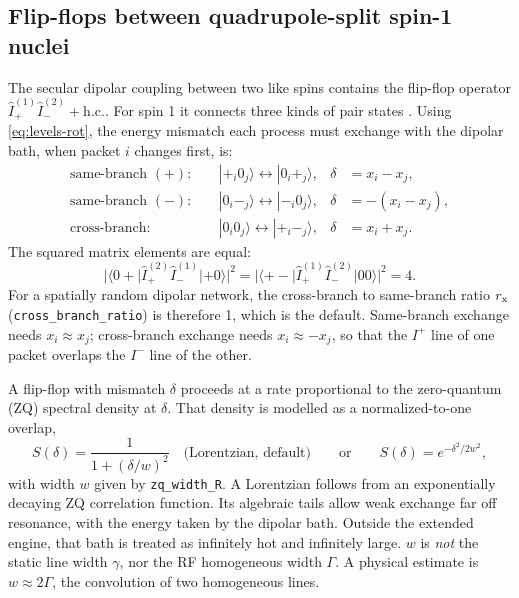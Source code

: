 \documentclass[11pt]{article}
\newcommand{\Iplus}{I^{+}}
\newcommand{\Iminus}{I^{-}}
\newcommand{\code}[1]{\texttt{#1}}
\begin{document}
\subsection{Flip-flops between quadrupole-split spin-1 nuclei}
\label{sec:flipflop}

The secular dipolar coupling between two like spins contains the flip-flop operator
\(\hat I_+^{(1)}\hat I_-^{(2)}+\mathrm{h.c.}\). For spin 1 it connects three kinds of pair
states \cite{Abragam1961,SuterErnst1985,Eckman1982}. Using \cref{eq:levels-rot}, the energy
mismatch each process must exchange with the dipolar bath, when packet \(i\) changes first, is:
\begin{align}
\text{same-branch }(+):&\quad |{+}_i0_j\rangle\leftrightarrow|0_i{+}_j\rangle, & \delta&=x_i-x_j,\\
\text{same-branch }(-):&\quad |0_i{-}_j\rangle\leftrightarrow|{-}_i0_j\rangle, & \delta&=-(x_i-x_j),\\
\text{cross-branch}:&\quad |0_i0_j\rangle\leftrightarrow|{+}_i{-}_j\rangle, & \delta&=x_i+x_j .
\end{align}
The squared matrix elements are equal:
\begin{equation}
|\langle0{+}|\hat I_+^{(2)}\hat I_-^{(1)}|{+}0\rangle|^2=|\langle{+}{-}|\hat I_+^{(1)}\hat I_-^{(2)}|00\rangle|^2=4 .
\end{equation}
For a spatially random dipolar network, the cross-branch to same-branch ratio
\(r_{\rm x}\) (\code{cross\_branch\_ratio}) is therefore 1, which is the default. Same-branch
exchange needs \(x_i\approx x_j\); cross-branch exchange needs \(x_i\approx-x_j\), so that the
\(\Iplus\) line of one packet overlaps the \(\Iminus\) line of the other.

A flip-flop with mismatch \(\delta\) proceeds at a rate proportional to the zero-quantum (ZQ)
spectral density at \(\delta\). That density is modelled as a normalized-to-one overlap,
\begin{equation}
S(\delta)=\frac{1}{1+(\delta/w)^2}\quad\text{(Lorentzian, default)}\qquad\text{or}\qquad
S(\delta)=e^{-\delta^2/2w^2},
\label{eq:overlap}
\end{equation}
with width \(w\) given by \code{zq\_width\_R}. A Lorentzian follows from an exponentially
decaying ZQ correlation function. Its algebraic tails allow weak exchange far off resonance,
with the energy taken by the dipolar bath. Outside the extended engine, that bath is treated as
infinitely hot and infinitely large. \(w\) is \emph{not} the static line width \(\gamma\), nor
the RF homogeneous width \(\Gamma\). A physical estimate is \(w\approx2\Gamma\), the convolution
of two homogeneous lines.
\end{document}

